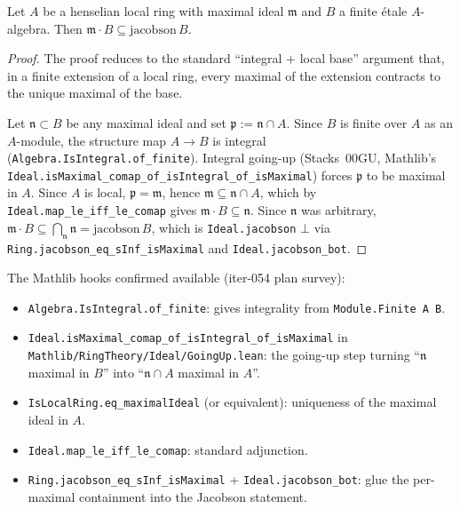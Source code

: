 \begin{lemma}
\label{lem:henselianPair-jac}
Let $A$ be a henselian local ring with maximal ideal $\mathfrak m$
and $B$ a finite étale $A$-algebra. Then
$\mathfrak m \cdot B \subseteq \mathrm{jacobson}\,B$.
\end{lemma}

\begin{proof}
The proof reduces to the standard ``integral $+$ local base''
argument that, in a finite extension of a local ring, every
maximal of the extension contracts to the unique maximal of the
base.

Let $\mathfrak n \subset B$ be any maximal ideal and set
$\mathfrak p := \mathfrak n \cap A$. Since $B$ is finite over
$A$ as an $A$-module, the structure map $A \to B$ is integral
(\texttt{Algebra.IsIntegral.of\_finite}). Integral going-up
(Stacks~00GU, Mathlib's
\texttt{Ideal.isMaximal\_comap\_of\_isIntegral\_of\_isMaximal})
forces $\mathfrak p$ to be maximal in $A$. Since $A$ is local,
$\mathfrak p = \mathfrak m$, hence $\mathfrak m \subseteq
\mathfrak n \cap A$, which by
\texttt{Ideal.map\_le\_iff\_le\_comap} gives
$\mathfrak m \cdot B \subseteq \mathfrak n$. Since $\mathfrak n$
was arbitrary,
$\mathfrak m \cdot B \subseteq \bigcap_{\mathfrak n}
\mathfrak n = \mathrm{jacobson}\,B$, which is
\texttt{Ideal.jacobson} $\bot$ via
\texttt{Ring.jacobson\_eq\_sInf\_isMaximal} and
\texttt{Ideal.jacobson\_bot}.
\end{proof}

The Mathlib hooks confirmed available (iter-054 plan survey):

\begin{itemize}
\item \texttt{Algebra.IsIntegral.of\_finite}: gives integrality
  from \texttt{Module.Finite A B}.
\item \texttt{Ideal.isMaximal\_comap\_of\_isIntegral\_of\_isMaximal}
  in \texttt{Mathlib/RingTheory/Ideal/GoingUp.lean}: the going-up
  step turning ``$\mathfrak n$ maximal in $B$'' into
  ``$\mathfrak n \cap A$ maximal in $A$''.
\item \texttt{IsLocalRing.eq\_maximalIdeal} (or equivalent):
  uniqueness of the maximal ideal in $A$.
\item \texttt{Ideal.map\_le\_iff\_le\_comap}: standard adjunction.
\item \texttt{Ring.jacobson\_eq\_sInf\_isMaximal} +
  \texttt{Ideal.jacobson\_bot}: glue the per-maximal containment
  into the Jacobson statement.
\end{itemize}

